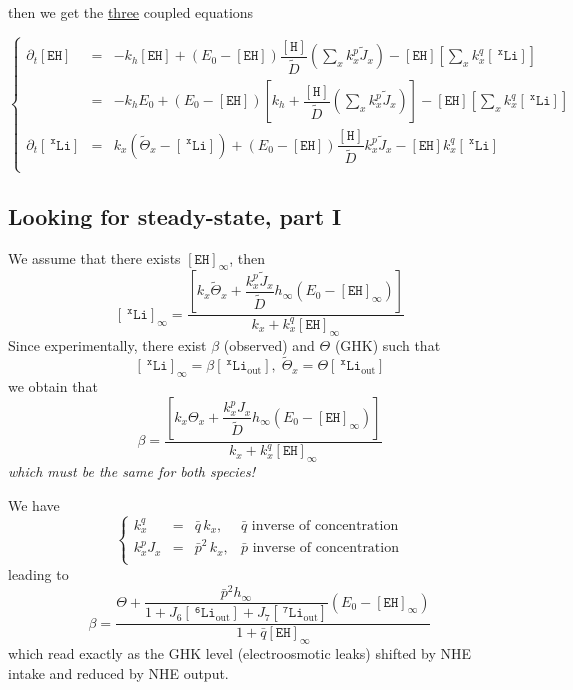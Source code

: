 \documentclass[aps,onecolumn,12pt]{revtex4}
\newcommand{\mychem}[1]{\mathtt{#1}}
\newcommand{\myconc}[1]{\left\lbrack{#1}\right\rbrack}
\newcommand{\spLi}[1]{{~^{\mychem{#1}}\mychem{Li}}}
\newcommand{\Li}[1]{\myconc{\spLi{#1}}}
\newcommand{\spLiOut}[1]{{\spLi{#1}}_{\mathrm{out}}}
\newcommand{\LiOut}[1]{\myconc{\spLiOut{#1}}}
\newcommand{\spEHin}{\mychem{EH}}
\newcommand{\EHin}{\myconc{\spEHin}}
\newcommand{\spproton}{\mychem{H}}
\newcommand{\proton}{\myconc{\spproton}}
\begin{document}
then we get the \underline{three} coupled equations  

\begin{equation}
\boxed{
\left\lbrace
	\begin{array}{rcl}
		\partial_t\EHin & = & -k_h \EHin + \left(E_0- \EHin\right) \dfrac{\proton}{\tilde{D}} \left(\sum_x k_x^p \tilde{J}_x \right)  
		- \EHin \left\lbrack {\sum_x k_x^q \Li{x}} \right\rbrack\\
		& = & 
		-k_h E_0+ \left(E_0- \EHin\right)\left\lbrack k_h+ \dfrac{\proton}{\tilde{D}} \left(\sum_x k_x^p \tilde{J}_x \right)\right] 
		- \EHin \left\lbrack {\sum_x k_x^q \Li{x}} \right\rbrack\\
		\partial_t\Li{x} & = & k_x \left(\tilde{\Theta}_x -\Li{x} \right)  + \left(E_0-\EHin\right) \dfrac{\proton}{\tilde{D}}   k_x^p \tilde{J}_x  - \EHin k_x^q \Li{x}\\
	\end{array}
\right.
}
\end{equation}


\subsection{Looking for steady-state, part I}
We assume that there exists $\EHin_\infty$, then
\begin{equation}
	\Li{x}_\infty = 
	\dfrac{\left\lbrack k_x\tilde{\Theta}_x+ \dfrac{k_x^p \tilde{J}_x}{\tilde{D}} h_\infty\left(E_0-\EHin_\infty\right)\right\rbrack}
	{k_x+ k_x^q \EHin_\infty}
\end{equation}
Since experimentally, there exist ${\beta}$ (observed) and $\Theta$ (GHK) such that
\begin{equation}
	\Li{x}_\infty=\beta\LiOut{x},\;\tilde{\Theta}_x = \Theta \LiOut{x}
\end{equation}
we obtain that
\begin{equation}
		\beta = \dfrac{\left\lbrack k_x{\Theta}_x+ \dfrac{k_x^p {J}_x}{\tilde{D}} h_\infty\left(E_0-\EHin_\infty\right)\right\rbrack}
	{k_x+ k_x^q \EHin_\infty}
\end{equation}
\textit{which must be the same for both species!}

We have
\begin{equation}
\left\lbrace
	\begin{array}{rcll}
	k_x^q    & = & \bar{q}\,k_x,  &  \bar{q}\text{ inverse of concentration}\\
	k_x^pJ_x & = & \bar{p}^2\,k_x, & \bar{p}\text{ inverse of concentration}\\
	\end{array}
\right.
\end{equation}
leading to
\begin{equation}
	\label{steady_beta}
	\beta = \dfrac{\Theta+\dfrac{\bar{p}^2 h_\infty }{1+J_6\LiOut{6}+J_7\LiOut{7}} \left(E_0-\EHin_\infty\right)}{1+\bar{q}\EHin_\infty}
\end{equation}
which read exactly as the GHK level (electroosmotic leaks) shifted by NHE intake and reduced by NHE output.
\end{document}

